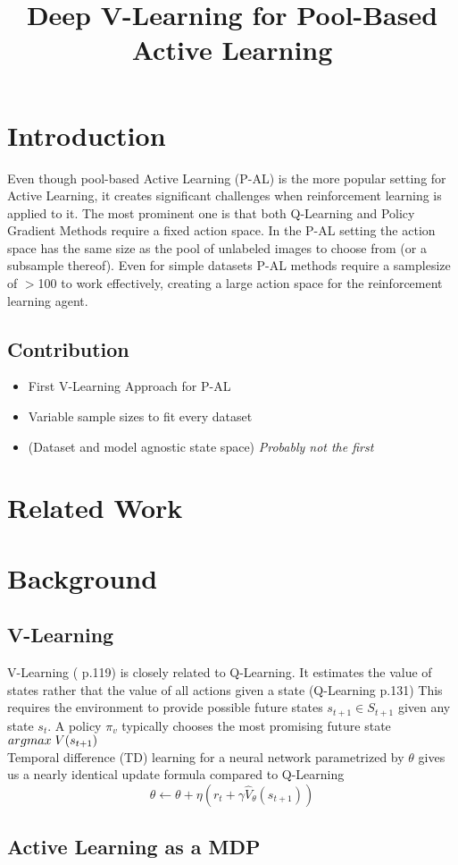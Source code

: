 \documentclass[]{article}
\title{Deep V-Learning for Pool-Based Active Learning}
\begin{document}
\maketitle

\section{Introduction}
Even though pool-based Active Learning (P-AL) is the more popular setting for Active Learning, it creates significant challenges when reinforcement learning is applied to it.
The most prominent one is that both Q-Learning and Policy Gradient Methods require a fixed action space. 
In the P-AL setting the action space has the same size as the pool of unlabeled images to choose from (or a subsample thereof).
Even for simple datasets P-AL methods require a samplesize of $>$100 to work effectively, creating a large action space for the reinforcement learning agent. \\

\subsection{Contribution}
\begin{itemize}
	\item First V-Learning Approach for P-AL
	\item Variable sample sizes to fit every dataset
	\item (Dataset and model agnostic state space) \textit{Probably not the first}
\end{itemize}

\section{Related Work}

\section{Background}
\subsection{V-Learning}
V-Learning (\cite{rl_intro} p.119) is closely related to Q-Learning. It estimates the value of states rather that the value of all actions given a state (Q-Learning \cite{rl_intro} p.131) 
This requires the environment to provide possible future states $s_{t+1} \in S_{t+1}$ given any state $s_t$.
A policy $\pi_v$ typically chooses the most promising future state $argmax \hspace{1mm} V(s_{t+1})$ \\
Temporal difference (TD) learning for a neural network parametrized by $\theta$ gives us a nearly identical update formula compared to Q-Learning
\begin{equation}
	\theta \leftarrow \theta + \eta \left( r_t + \gamma \hat V_\theta(s_{t+1}) \right)
\end{equation} 

\subsection{Active Learning as a MDP}




 
\end{document}
